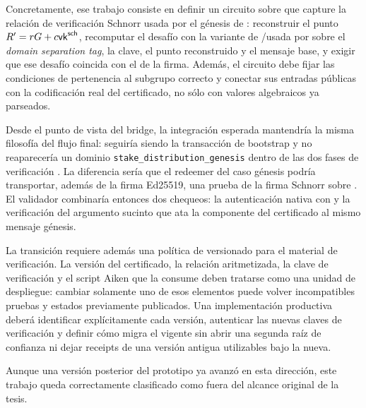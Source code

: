 Concretamente, ese trabajo consiste en definir un circuito \Groth sobre \BLS que capture la relación de verificación Schnorr usada por el génesis de \Lagrange: reconstruir el punto $R' = rG + c\mathsf{vk}^{\mathsf{sch}}$, recomputar el desafío con la variante de \PoseidonHash/\MidnightPoseidonHash usada por \Mithril sobre el \textit{domain separation tag}, la clave, el punto reconstruido y el mensaje base, y exigir que ese desafío coincida con el de la firma. Además, el circuito debe fijar las condiciones de pertenencia al subgrupo correcto y conectar sus entradas públicas con la codificación real del certificado, no sólo con valores algebraicos ya parseados.

Desde el punto de vista del bridge, la integración esperada mantendría la misma filosofía del flujo final: \StakeDistributionGenesisTxTemplate seguiría siendo la transacción de bootstrap y no reaparecería un dominio \texttt{stake\_distribution\_genesis} dentro de las dos fases de verificación \STM. La diferencia sería que el redeemer del caso génesis podría transportar, además de la firma Ed25519, una prueba \Groth de la firma Schnorr sobre \Jubjub. El validador combinaría entonces dos chequeos: la autenticación nativa con \GenesisVerificationKey y la verificación del argumento sucinto que ata la componente \Lagrange del certificado al mismo mensaje génesis.

La transición requiere además una política de versionado para el material de verificación. La versión del certificado, la relación aritmetizada, la clave de verificación y el script Aiken que la consume deben tratarse como una unidad de despliegue: cambiar solamente uno de esos elementos puede volver incompatibles pruebas y estados previamente publicados. Una implementación productiva deberá identificar explícitamente cada versión, autenticar las nuevas claves de verificación y definir cómo migra el \StakeDistributionUTxO vigente sin abrir una segunda raíz de confianza ni dejar receipts de una versión antigua utilizables bajo la nueva.

Aunque una versión posterior del prototipo ya avanzó en esta dirección, este trabajo queda correctamente clasificado como fuera del alcance original de la tesis.
